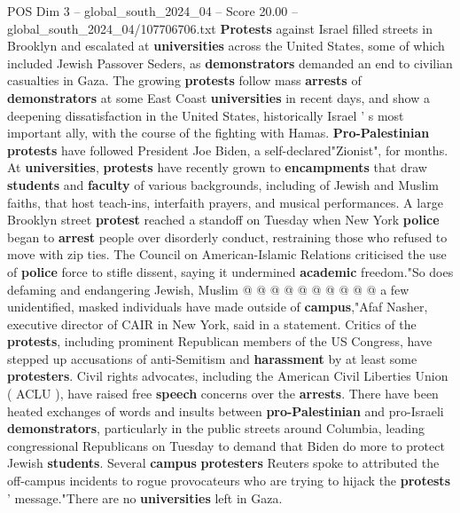 \begin{textsample}{POS Dim 3 – global\_south\_2024\_04 – Score 20.00 – global\_south\_2024\_04/107706706.txt}  \label{ex:f3_pos_214}
\textbf{Protests} against Israel filled streets in Brooklyn and escalated at \textbf{universities} across the United States, some of which included Jewish Passover Seders, as \textbf{demonstrators} demanded an end to civilian casualties in Gaza.
The growing \textbf{protests} follow mass \textbf{arrests} of \textbf{demonstrators} at some East Coast \textbf{universities} in recent days, and show a deepening dissatisfaction in the United States, historically Israel ' s most important ally, with the course of the fighting with Hamas. \textbf{Pro-Palestinian} \textbf{protests} have followed President Joe Biden, a self-declared"Zionist", for months.
At \textbf{universities}, \textbf{protests} have recently grown to \textbf{encampments} that draw \textbf{students} and \textbf{faculty} of various backgrounds, including of Jewish and Muslim faiths, that host teach-ins, interfaith prayers, and musical performances.
A large Brooklyn street \textbf{protest} reached a standoff on Tuesday when New York \textbf{police} began to \textbf{arrest} people over disorderly conduct, restraining those who refused to move with zip ties.
The Council on American-Islamic Relations criticised the use of \textbf{police} force to stifle dissent, saying it undermined \textbf{academic} freedom."So does defaming and endangering Jewish, Muslim @ @ @ @ @ @ @ @ @ @ a few unidentified, masked individuals have made outside of \textbf{campus},"Afaf Nasher, executive director of CAIR in New York, said in a statement.
Critics of the \textbf{protests}, including prominent Republican members of the US Congress, have stepped up accusations of anti-Semitism and \textbf{harassment} by at least some \textbf{protesters}.
Civil rights advocates, including the American Civil Liberties Union ( ACLU ), have raised free \textbf{speech} concerns over the \textbf{arrests}.
There have been heated exchanges of words and insults between \textbf{pro-Palestinian} and pro-Israeli \textbf{demonstrators}, particularly in the public streets around Columbia, leading congressional Republicans on Tuesday to demand that Biden do more to protect Jewish \textbf{students}.
Several \textbf{campus} \textbf{protesters} Reuters spoke to attributed the off-campus incidents to rogue provocateurs who are trying to hijack the \textbf{protests} ' message."There are no \textbf{universities} left in Gaza.

\end{textsample}
